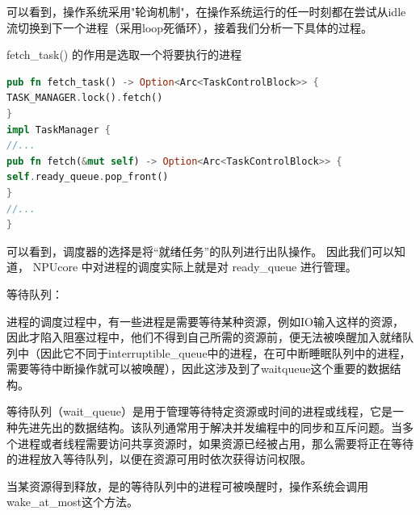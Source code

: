 可以看到，操作系统采⽤"轮询机制"，在操作系统运⾏的任⼀时刻都在尝试从idle流切换到下一个进程（采用loop死循环），接着我们分析⼀下具体的过程。

fetch_task() 的作用是选取⼀个将要执⾏的进程 

\begin{lstlisting}[language=rust,caption={fetch_task函数}]
    pub fn fetch_task() -> Option<Arc<TaskControlBlock>> { 
TASK_MANAGER.lock().fetch() 
}
impl TaskManager { 
//... 
pub fn fetch(&mut self) -> Option<Arc<TaskControlBlock>> { 
self.ready_queue.pop_front() 
} 
//... 
} 
\end{lstlisting}

可以看到，调度器的选择是将“就绪任务”的队列进⾏出队操作。
因此我们可以知道， NPUcore 中对进程的调度实际上就是对 ready_queue 进行管理。 

等待队列：

进程的调度过程中，有一些进程是需要等待某种资源，例如IO输入这样的资源，因此才陷入阻塞过程中，他们不得到自己所需的资源前，便无法被唤醒加入就绪队列中（因此它不同于interruptible_queue中的进程，在可中断睡眠队列中的进程，需要等待中断操作就可以被唤醒），因此这涉及到了waitqueue这个重要的数据结构。

等待队列（wait_queue）是用于管理等待特定资源或时间的进程或线程，它是一种先进先出的数据结构。该队列通常用于解决并发编程中的同步和互斥问题。当多个进程或者线程需要访问共享资源时，如果资源已经被占用，那么需要将正在等待的进程放入等待队列，以便在资源可用时依次获得访问权限。

当某资源得到释放，是的等待队列中的进程可被唤醒时，操作系统会调用wake_at_most这个方法。

